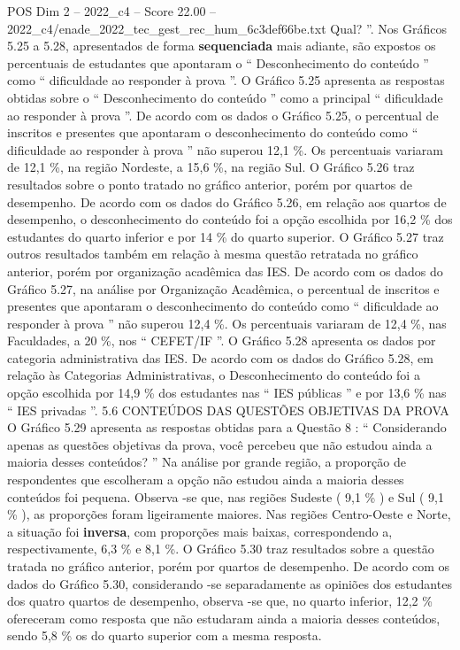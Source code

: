 \begin{textsample}{POS Dim 2 – 2022\_c4 – Score 22.00 – 2022\_c4/enade\_2022\_tec\_gest\_rec\_hum\_6c3def66be.txt}
Qual? ”.
Nos Gráficos 5.25 a 5.28, apresentados de forma \textbf{sequenciada} mais adiante, são expostos os percentuais de estudantes que apontaram o “ Desconhecimento do conteúdo ” como “ dificuldade ao responder à prova ”.
O Gráfico 5.25 apresenta as respostas obtidas sobre o “ Desconhecimento do conteúdo ” como a principal “ dificuldade ao responder à prova ”.
De acordo com os dados o Gráfico 5.25, o percentual de inscritos e presentes que apontaram o desconhecimento do conteúdo como “ dificuldade ao responder à prova ” não superou 12,1 \%.
Os percentuais variaram de 12,1 \%, na região Nordeste, a 15,6 \%, na região Sul.
O Gráfico 5.26 traz resultados sobre o ponto tratado no gráfico anterior, porém por quartos de desempenho.
De acordo com os dados do Gráfico 5.26, em relação aos quartos de desempenho, o desconhecimento do conteúdo foi a opção escolhida por 16,2 \% dos estudantes do quarto inferior e por 14 \% do quarto superior.
O Gráfico 5.27 traz outros resultados também em relação à mesma questão retratada no gráfico anterior, porém por organização acadêmica das IES.
De acordo com os dados do Gráfico 5.27, na análise por Organização Acadêmica, o percentual de inscritos e presentes que apontaram o desconhecimento do conteúdo como “ dificuldade ao responder à prova ” não superou 12,4 \%.
Os percentuais variaram de 12,4 \%, nas Faculdades, a 20 \%, nos “ CEFET/IF ”.
O Gráfico 5.28 apresenta os dados por categoria administrativa das IES.
De acordo com os dados do Gráfico 5.28, em relação às Categorias Administrativas, o Desconhecimento do conteúdo foi a opção escolhida por 14,9 \% dos estudantes nas “ IES públicas ” e por 13,6 \% nas “ IES privadas ”. 5.6 CONTEÚDOS DAS QUESTÕES OBJETIVAS DA PROVA O Gráfico 5.29 apresenta as respostas obtidas para a Questão 8 : “ Considerando apenas as questões objetivas da prova, você percebeu que não estudou ainda a maioria desses conteúdos? ” Na análise por grande região, a proporção de respondentes que escolheram a opção não estudou ainda a maioria desses conteúdos foi pequena.
Observa -se que, nas regiões Sudeste ( 9,1 \% ) e Sul ( 9,1 \% ), as proporções foram ligeiramente maiores.
Nas regiões Centro-Oeste e Norte, a situação foi \textbf{inversa}, com proporções mais baixas, correspondendo a, respectivamente, 6,3 \% e 8,1 \%.
O Gráfico 5.30 traz resultados sobre a questão tratada no gráfico anterior, porém por quartos de desempenho.
De acordo com os dados do Gráfico 5.30, considerando -se separadamente as opiniões dos estudantes dos quatro quartos de desempenho, observa -se que, no quarto inferior, 12,2 \% ofereceram como resposta que não estudaram ainda a maioria desses conteúdos, sendo 5,8 \% os do quarto superior com a mesma resposta.

\end{textsample}
